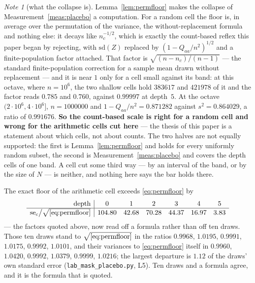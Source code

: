 \documentclass[11pt,a4paper]{article}
\theoremstyle{plain}
\theoremstyle{definition}
\theoremstyle{remark}
\newtheorem{note}[theorem]{Note}
\begin{document}
\begin{note}[what the collapse is]\label{note:collapse}
Lemma~\ref{lem:permfloor} makes the collapse of
Measurement~\ref{meas:placebo} a computation. For a random cell the
floor is, in average over the permutation of the variance, the
without-replacement
formula and nothing else: it decays like $n_c^{-1/2}$, which is exactly the count-based reflex this paper
began by rejecting, with $\mathrm{sd}(Z)$ replaced by
$(1-Q_{aa}/n^2)^{1/2}$ and a finite-population factor attached. That
factor is $\sqrt{(n-n_c)/(n-1)}$ --- the standard finite-population
correction for a sample mean drawn without replacement
\cite{Cochran} --- and it is near $1$ only for a cell
small against its band: at this octave, where $n=10^6$, the two
shallow cells hold $383617$ and $421978$ of it and the factor reads
$0.785$ and $0.760$, against $0.99997$ at depth~$5$. At the
octave $(2\cdot10^6,4\cdot10^6]$, $n=1000000$ and
$1-Q_{aa}/n^2=0.871282$ against $s^2=0.864029$, a ratio of
$0.991676$. \textbf{So the count-based scale is right for a random
cell and wrong for the arithmetic cells cut here} --- the thesis of
this paper is a statement about which cells, not about counts. The
two halves are not equally supported: the first is
Lemma~\ref{lem:permfloor} and holds for every uniformly random subset,
the second is Measurement~\ref{meas:placebo} and covers the depth cells
of one band. A cell cut some third way --- by an interval of the band,
or by the size of $N$ --- is neither, and nothing here says the bar
holds there.

The exact floor of the arithmetic cell exceeds \eqref{eq:permfloor} by
\[
\begin{array}{r|cccccc}
 \text{depth} & 0 & 1 & 2 & 3 & 4 & 5\\\hline
 \mathrm{se}_c\big/\sqrt{\eqref{eq:permfloor}}
   & 104.80 & 42.68 & 70.28 & 44.37 & 16.97 & 3.83
\end{array}
\]
--- the factors quoted above, now read off a formula rather than off
ten draws. Those ten draws stand to $\sqrt{\eqref{eq:permfloor}}$ in
the ratios $0.9968$, $1.0195$, $0.9991$, $1.0175$, $0.9992$,
$1.0101$, and their variances to \eqref{eq:permfloor} itself in
$0.9960$, $1.0420$, $0.9992$, $1.0379$, $0.9999$, $1.0216$; the
largest departure is $1.12$ of the draws' own standard error
(\texttt{lab\_mask\_placebo.py}, L5). Ten draws and a formula agree,
and it is the formula that is quoted.
\end{note}
\end{document}
